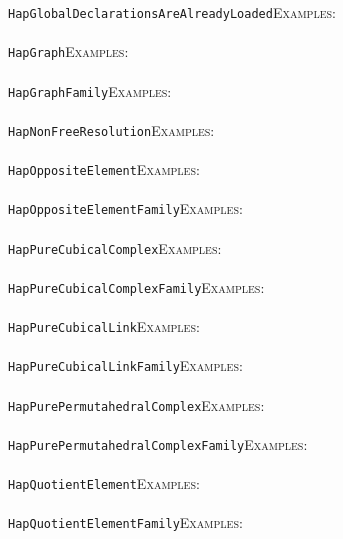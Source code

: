 \documentclass[a4paper,11pt]{report}
\begin{document}
{{ \texttt{HapGlobalDeclarationsAreAlreadyLoaded}{\nobreakspace}{\nobreakspace}{\nobreakspace}{\nobreakspace}\textsc{Examples:} \\
 \\
 \texttt{HapGraph}{\nobreakspace}{\nobreakspace}{\nobreakspace}{\nobreakspace}\textsc{Examples:} \\
 \\
 \texttt{HapGraphFamily}{\nobreakspace}{\nobreakspace}{\nobreakspace}{\nobreakspace}\textsc{Examples:} \\
 \\
 \texttt{HapNonFreeResolution}{\nobreakspace}{\nobreakspace}{\nobreakspace}{\nobreakspace}\textsc{Examples:} \\
 \\
 \texttt{HapOppositeElement}{\nobreakspace}{\nobreakspace}{\nobreakspace}{\nobreakspace}\textsc{Examples:} \\
 \\
 \texttt{HapOppositeElementFamily}{\nobreakspace}{\nobreakspace}{\nobreakspace}{\nobreakspace}\textsc{Examples:} \\
 \\
 \texttt{HapPureCubicalComplex}{\nobreakspace}{\nobreakspace}{\nobreakspace}{\nobreakspace}\textsc{Examples:} \\
 \\
 \texttt{HapPureCubicalComplexFamily}{\nobreakspace}{\nobreakspace}{\nobreakspace}{\nobreakspace}\textsc{Examples:} \\
 \\
 \texttt{HapPureCubicalLink}{\nobreakspace}{\nobreakspace}{\nobreakspace}{\nobreakspace}\textsc{Examples:} \\
 \\
 \texttt{HapPureCubicalLinkFamily}{\nobreakspace}{\nobreakspace}{\nobreakspace}{\nobreakspace}\textsc{Examples:} \\
 \\
 \texttt{HapPurePermutahedralComplex}{\nobreakspace}{\nobreakspace}{\nobreakspace}{\nobreakspace}\textsc{Examples:} \\
 \\
 \texttt{HapPurePermutahedralComplexFamily}{\nobreakspace}{\nobreakspace}{\nobreakspace}{\nobreakspace}\textsc{Examples:} \\
 \\
 \texttt{HapQuotientElement}{\nobreakspace}{\nobreakspace}{\nobreakspace}{\nobreakspace}\textsc{Examples:} \\
 \\
 \texttt{HapQuotientElementFamily}{\nobreakspace}{\nobreakspace}{\nobreakspace}{\nobreakspace}\textsc{Examples:} \\
}}
\end{document}

